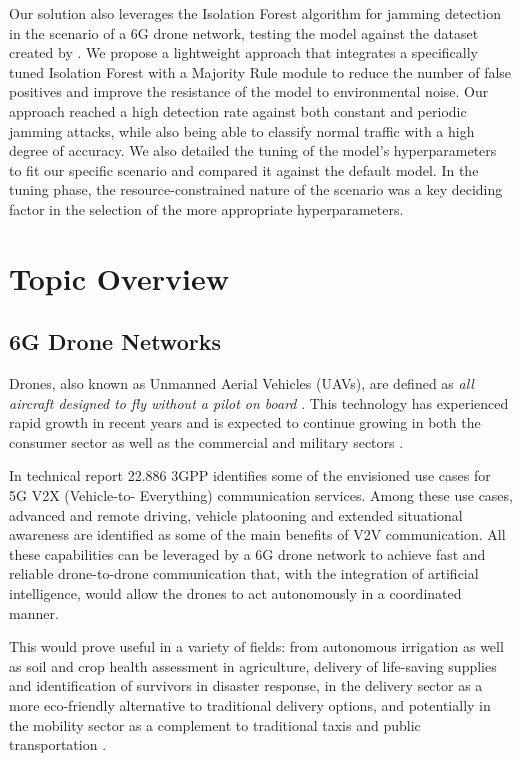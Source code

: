 \documentclass[futureinternet,article,submit,pdftex,moreauthors]{Definitions/mdpi}
\begin{document}
Our solution also leverages the Isolation Forest algorithm for jamming detection in the scenario of a 6G drone network, testing the model against the dataset created by \cite{JammingDetectionIoT-Hussain}.
We propose a lightweight approach that integrates a specifically tuned Isolation Forest with a Majority Rule module to reduce the number of false positives and improve the resistance of the model to environmental noise.
Our approach reached a high detection rate against both constant and periodic jamming attacks, while also being able to classify normal traffic with a high degree of accuracy. We also detailed the tuning of the model's hyperparameters to fit our specific scenario and compared it 
against the default model. In the tuning phase, the resource-constrained nature of the scenario was a key deciding factor in the selection of the more appropriate hyperparameters.

\section{Topic Overview}

\subsection{6G Drone Networks}

Drones, also known as Unmanned Aerial Vehicles (UAVs), are defined as \textit{all aircraft designed to fly
without a pilot on board} \cite{DronesEC}. This technology has experienced rapid growth in recent years and is expected to 
continue growing in both the consumer sector as well as the commercial and military sectors \cite{DronesStatisticsLaricchia}.

In technical report 22.886 \cite{5GV2XSultan} 3GPP identifies some of the envisioned use cases for 5G V2X (Vehicle-to-
Everything) communication services. Among these use cases, advanced and remote driving, vehicle platooning and extended situational awareness are identified as some of the main benefits
of V2V communication. All these capabilities can be leveraged by a 6G drone network to achieve fast and reliable drone-to-drone communication that, with the integration of artificial intelligence, 
would allow the drones to act autonomously in a coordinated manner. 

This would prove useful in a variety of fields: from autonomous irrigation as well as soil and crop health assessment in agriculture, 
delivery of life-saving supplies and identification of survivors in disaster response, in the delivery sector as a more eco-friendly alternative to traditional 
delivery options, and potentially in the mobility sector as a complement to traditional taxis and public transportation \cite{DroneCommHassija}. 
\end{document}
